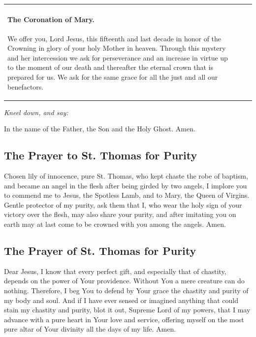 \documentclass{article}
\begin{document}
\begin{tabularx}{\textwidth}{ |X|X|X| }
\paragraph{The Coronation of Mary.} We offer you, Lord Jesus, this fifteenth and last decade in honor of the Crowning in glory of your holy Mother in heaven. Through this mystery and her intercession we ask for perseverance and an increase in virtue up to the moment of our death and thereafter the eternal crown that is prepared for us. We ask for the same grace for all the just and all our benefactors.
&
\hline
\end{tabularx}

\pagebreak
{}

\begin{multicols}{2}

\textit{Kneel down, and say:}

In the name of the Father, the Son and the Holy Ghost. Amen.

\subsection*{The Prayer to St. Thomas for Purity}

Chosen lily of innocence, pure St. Thomas,
who kept chaste the robe of baptism,
and became an angel in the flesh after being girded by two angels,
I implore you to commend me to Jesus, the Spotless Lamb,
and to Mary, the Queen of Virgins.
Gentle protector of my purity, ask them that I,
who wear the holy sign of your victory over the flesh,
may also share your purity,
and after imitating you on earth
may at last come to be crowned with you among the angels. Amen. 

\subsection*{The Prayer of St. Thomas for Purity}

Dear Jesus,
I know that every perfect gift,
and especially that of chastity,
depends on the power of Your providence.
Without You a mere creature can do nothing.
Therefore, I beg You to defend by Your grace
the chastity and purity of my body and soul.
And if I have ever sensed or imagined anything
that could stain my chastity and purity,
blot it out, Supreme Lord of my powers,
that I may advance with a pure heart in Your love and service,
offering myself on the most pure altar of Your divinity
all the days of my life. Amen.


\end{multicols}
\end{document}
